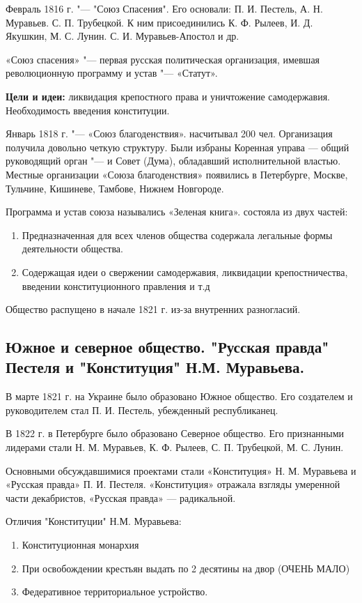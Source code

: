 Февраль 1816 г. "--- "Союз Спасения". Его основали: П. И. Пестель, А. Н. Муравьев. С. П. Трубецкой. К ним присоединились К. Ф. Рылеев, И. Д. Якушкин, М. С. Лунин. С. И. Муравьев-Апостол и др.

«Союз спасения» "--- первая русская политическая организация, имевшая революционную программу и устав "--- «Статут».

\textbf{Цели и идеи:} ликвидация крепостного права и уничтожение самодержавия. Необходимость введения конституции.

Январь 1818 г. "--- «Союз благоденствия». насчитывал 200 чел. Организация получила довольно четкую структуру. Были избраны Коренная управа — общий руководящий орган "--- и Совет (Дума), обладавший исполнительной властью. Местные организации «Союза благоденствия» появились в Петербурге, Москве, Тульчине, Кишиневе, Тамбове, Нижнем Новгороде. 

Программа и устав союза назывались «Зеленая книга». состояла из двух частей:

\begin{enumerate}
    \item{Предназначенная для всех членов общества содержала легальные формы деятельности общества.}
    \item{Содержащая идеи о свержении самодержавия, ликвидации крепостничества, введении конституционного правления и т.д}
\end{enumerate}

Общество распущено в начале 1821 г. из-за внутренних разногласий.

\subsection{Южное и северное общество. "Русская правда" Пестеля и "Конституция" Н.М. Муравьева.}

В марте 1821 г. на Украине было образовано Южное общество. Его создателем и руководителем стал П. И. Пестель, убежденный республиканец. 

В 1822 г. в Петербурге было образовано Северное общество. Его признанными лидерами стали Н. М. Муравьев, К. Ф. Рылеев, С. П. Трубецкой, М. С. Лунин.

Основными обсуждавшимися проектами стали «Конституция» Н. М. Муравьева и «Русская правда» П. И. Пестеля. «Конституция» отражала взгляды умеренной части декабристов, «Русская правда» — радикальной.

Отличия "Конституции" Н.М. Муравьева:

\begin{enumerate}
    \item{Конституционная монархия}
    \item{При освобождении крестьян выдать по 2 десятины на двор (ОЧЕНЬ МАЛО)}
    \item{Федеративное территориальное устройство.}
\end{enumerate}

